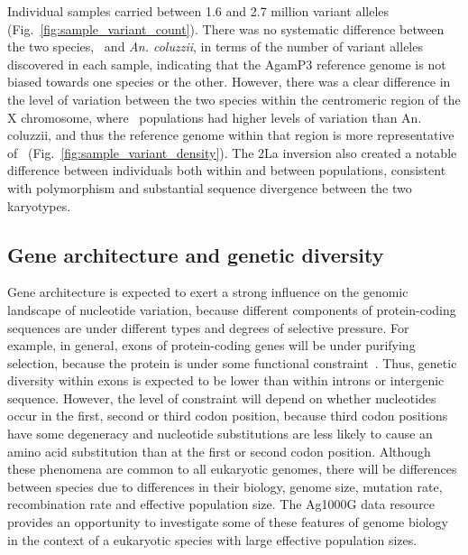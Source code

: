 \documentclass[a4paper,11pt,abstracton,hidelinks]{scrartcl}
\begin{document}
Individual samples carried between 1.6 and 2.7 million variant alleles (Fig.~\ref{fig:sample_variant_count}).
%
There was no systematic difference between the two species, \agam\ and \textit{An. coluzzii}, in terms of the number of variant alleles discovered in each sample, indicating that the AgamP3 reference genome is not biased towards one species or the other.
%
However, there was a clear difference in the level of variation between the two species within the centromeric region of the X chromosome, where \agam\ populations had higher levels of variation than An. coluzzii, and thus the reference genome within that region is more representative of \acol\ (Fig.~\ref{fig:sample_variant_density}).
%
The 2La inversion also created a notable difference between individuals both within and between populations, consistent with polymorphism and substantial sequence divergence between the two karyotypes.


\subsection{Gene architecture and genetic diversity}\label{subsec:gene-architecture-and-genetic-diversity}


%
Gene architecture is expected to exert a strong influence on the genomic landscape of nucleotide variation, because different components of protein-coding sequences are under different types and degrees of selective pressure.
%
For example, in general, exons of protein-coding genes will be under purifying selection, because the protein is under some functional constraint~\parencite{Ohta1996}.
%
Thus, genetic diversity within exons is expected to be lower than within introns or intergenic sequence.
%
However, the level of constraint will depend on whether nucleotides occur in the first, second or third codon position, because third codon positions have some degeneracy and nucleotide substitutions are less likely to cause an amino acid substitution than at the first or second codon position.
%
Although these phenomena are common to all eukaryotic genomes, there will be differences between species due to differences in their biology, genome size, mutation rate, recombination rate and effective population size.
%
The Ag1000G data resource provides an opportunity to investigate some of these features of genome biology in the context of a eukaryotic species with large effective population sizes.
\end{document}

